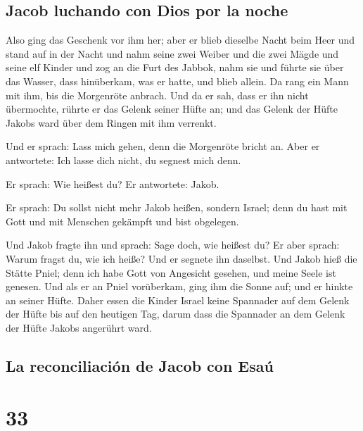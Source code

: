 \hypertarget{jacob-luchando-con-dios-por-la-noche}{%
\subsection{Jacob luchando con Dios por la
noche}\label{jacob-luchando-con-dios-por-la-noche}}

 Also ging das Geschenk vor ihm her; aber er blieb
dieselbe Nacht beim Heer  und stand auf in der Nacht und
nahm seine zwei Weiber und die zwei Mägde und seine elf Kinder und zog
an die Furt des Jabbok,  nahm sie und führte sie über das
Wasser, dass hinüberkam, was er hatte,  und blieb allein.
Da rang ein Mann mit ihm, bis die Morgenröte anbrach. 
Und da er sah, dass er ihn nicht übermochte, rührte er das Gelenk seiner
Hüfte an; und das Gelenk der Hüfte Jakobs ward über dem Ringen mit ihm
verrenkt.

 Und er sprach: Lass mich gehen, denn die Morgenröte
bricht an. Aber er antwortete: Ich lasse dich nicht, du segnest mich
denn.

 Er sprach: Wie heißest du? Er antwortete: Jakob.

 Er sprach: Du sollst nicht mehr Jakob heißen, sondern
Israel; denn du hast mit Gott und mit Menschen gekämpft und bist
obgelegen.

 Und Jakob fragte ihn und sprach: Sage doch, wie heißest
du? Er aber sprach: Warum fragst du, wie ich heiße? Und er segnete ihn
daselbst.  Und Jakob hieß die Stätte Pniel; denn ich habe
Gott von Angesicht gesehen, und meine Seele ist genesen. 
Und als er an Pniel vorüberkam, ging ihm die Sonne auf; und er hinkte an
seiner Hüfte.  Daher essen die Kinder Israel keine
Spannader auf dem Gelenk der Hüfte bis auf den heutigen Tag, darum dass
die Spannader an dem Gelenk der Hüfte Jakobs angerührt ward.

\hypertarget{la-reconciliaciuxf3n-de-jacob-con-esauxfa}{%
\subsection{La reconciliación de Jacob con
Esaú}\label{la-reconciliaciuxf3n-de-jacob-con-esauxfa}}

\hypertarget{section-32}{%
\section{33}\label{section-32}}

